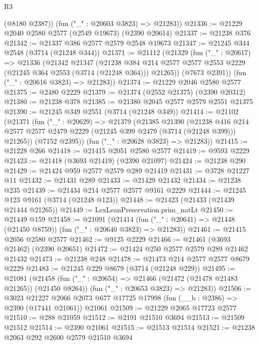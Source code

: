 \begin{lexlean}{R3}
\begin{coremodule}
        (@8180 @2387))
      (fun ("_" : @20603 @3823) => @21283))
@21336 := @21229 @2040 @2580 @2577 (@2549 @19673) (@2390 @20614)
@21337 := @21238 @376
@21342 := @21337 @386 @2577 @2579 @2548 @19673
@21347 := @21245 @344 @2548 (@3714 (@21248 @344))
@21371 := @21112
    (@21329
      (fun ("_" : @20617) =>
      @21336
        (@21342
          @21347
          (@21238
            @384
            @214
            @2577
            @2577
            @2553
            @2229
            (@21245 @364 @2553 (@3714 (@21248 @364)))
            @21265))
        (@7673 @2391))
      (fun ("_" : @20616 @3823) => @21283))
@21374 := @21229 @2046 @2580 @2577
@21375 := @2480 @2229
@21379 := @21374 (@2552 @21375) (@2390 @20312)
@21380 := @21238 @378
@21385 := @21380 @2045 @2577 @2579 @2551 @21375
@21390 := @21245 @349 @2551 (@3714 (@21248 @349))
@21414 := @21102
    (@21371
      (fun ("_" : @20629) =>
      @21379
        (@21385
          @21390
          (@21238
            @416
            @214
            @2577
            @2577
            @2479
            @2229
            (@21245 @399 @2479 (@3714 (@21248 @399)))
            @21265))
        (@7152 @2395))
      (fun ("_" : @20628 @3823) => @21283))
@21415 := @21228 @266
@21418 := @21415 @2051 @2580 @2577
@21419 := @9593 @2229
@21423 := @21418 (@3693 @21419) (@2390 @21097)
@21424 := @21238 @290
@21429 := @21424 @959 @2577 @2579 @289 @21419
@21431 := @3728 @21227 @11
@21432 := @21431 @289
@21433 := @21429 @21432
@21434 := @21238 @235
@21439 := @21434 @214 @2577 @2577 @9161 @2229
@21444 := @21245 @123 @9161 (@3714 (@21248 @123))
@21448 := @21423 (@21433 (@21439 @21444 @21265))
@21449 := LexLeanPreservation.prim_natLt
@21450 := @21449 @159
@21458 := @21091
    (@21414 (fun ("_" : @20641) => @21448 (@21450 @8759)) (fun ("_" : @20640 @3823) => @21283))
@21461 := @21415 @2056 @2580 @2577
@21462 := @9125 @2229
@21466 := @21461 (@3693 @21462) (@2390 @20651)
@21472 := @21424 @250 @2577 @2579 @289 @21462 @21432
@21473 := @21238 @248
@21478 := @21473 @214 @2577 @2577 @8679 @2229
@21483 := @21245 @229 @8679 (@3714 (@21248 @229))
@21495 := @21081
    (@21458
      (fun ("_" : @20654) => @21466 (@21472 (@21478 @21483 @21265)) (@21450 @8264))
      (fun ("_" : @20653 @3823) => @21283))
@21506 := @3023
    @21227
    @2066
    @2073
    @677
    @17725
    @17998
    (fun (__b : @2386) => @2390 (@17441 @21061))
    @21061
@21509 := @21229 @2065 @17723 @2577
@21510 := @288 @21059
@21512 := @2191 @21510 @3694
@21513 := @21509 @21512
@21514 := @2390 @21061
@21515 := @21513 @21514
@21521 := @21238 @2063 @292 @2600 @2579 @21510 @3694

\end{coremodule}
\end{lexlean}
